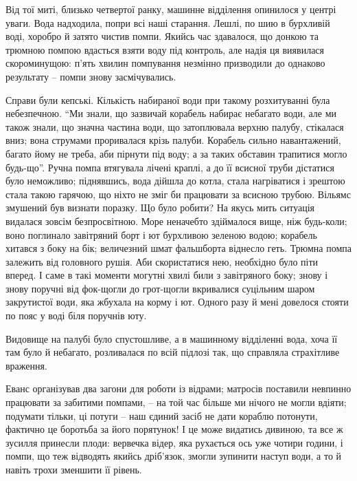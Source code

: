 Від тої миті, близько четвертої ранку, машинне відділення опинилося у центрі
уваги. Вода надходила, попри всі наші старання. Лешлі, по шию в бурхливій воді,
хоробро й затято чистив помпи. Якийсь час здавалося, що донкою та трюмною
помпою вдасться взяти воду під контроль, але надія ця виявилася скороминущою:
п’ять хвилин помпування незмінно призводили до однаково результату – помпи
знову засмічувались.

Справи були кепські. Кількість набираної води при такому розхитуванні була
небезпечною. \enquote{Ми знали, що зазвичай корабель набирає небагато води, але ми
також знали, що значна частина води, що затоплювала верхню палубу, стікалася
вниз; вона струмами проривалася крізь палуби. Корабель сильно навантажений,
багато йому не треба, аби пірнути під воду; а за таких обставин трапитися могло
будь-що}. Ручна помпа втягувала лічені краплі, а до її всисної труби дістатися
було неможливо; піднявшись, вода дійшла до котла, стала нагріватися і зрештою
стала такою гарячою, що ніхто не зміг би працювати за всисною трубою. Вільямс
змушений був визнати поразку. Що було робити? На якусь мить ситуація видалася
зовсім безпросвітною. Море неначебто здіймалося вище, ніж будь-коли; воно
поглинало завітряний борт і ют бурхливою зеленою водою; корабель хитався з боку
на бік; величезний шмат фальшборта віднесло геть. Трюмна помпа залежить від
головного рушія. Аби скористатися нею, необхідно було піти вперед. І саме в
такі моменти могутні хвилі били з завітряного боку; знову і знову поручні від
фок-щогли до грот-щогли вкривалися суцільним шаром закрутистої води, яка
жбухала на корму і ют. Одного разу й мені довелося стояти по пояс у воді біля
поручнів юту. 

Видовище на палубі було спустошливе, а в машинному відділенні вода, хоча її там
було й небагато, розливалася по всій підлозі так, що справляла страхітливе
враження.

Еванс організував два загони для роботи із відрами; матросів поставили невпинно
працювати за забитими помпами, – на той час більше ми нічого не могли вдіяти;
подумати тільки, ці потуги – наш єдиний засіб не дати кораблю потонути,
фактично це боротьба за його порятунок! І це може видатись дивиною, та все ж
зусилля принесли плоди: вервечка відер, яка рухається ось уже чотири години, і
помпи, що теж відводять якийсь дріб’язок, змогли зупинити наступ води, а то й
навіть трохи зменшити її рівень.

